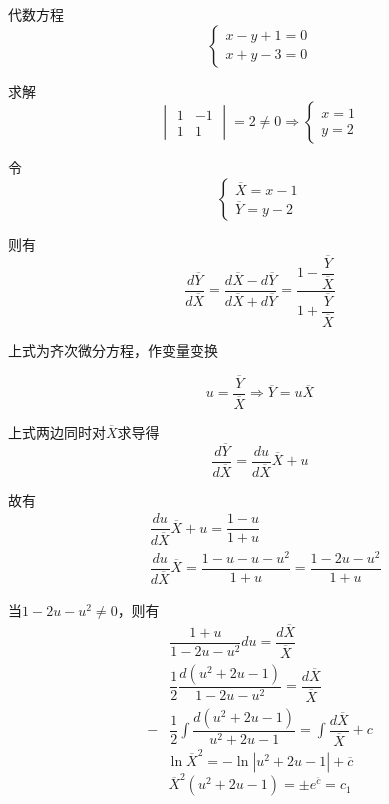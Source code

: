 \documentclass[oneside]{book} %
\begin{document}
\noindent {}
代数方程$$
\begin{cases}
    x - y + 1 = 0 \\
    x + y - 3 = 0
\end{cases}$$

求解$$\begin{vmatrix}
    1 & -1 \\
    1 & 1
\end{vmatrix} = 2 \neq 0 
\Rightarrow 
\begin{cases}
    x = 1 \\
    y = 2
\end{cases}$$

令$$
\begin{cases}
    \overline{X} = x - 1 \\
    \overline{Y} = y - 2
\end{cases} $$

则有$$\dfrac{d\overline{Y}}{d\overline{X}} = \dfrac{d\overline{X} - d\overline{Y}}{d\overline{X} + d\overline{Y}} = \dfrac{1 - \dfrac{\overline{Y}}{\overline{X}}}{1 + \dfrac{\overline{Y}}{\overline{X}}}$$

上式为齐次微分方程，作变量变换

$$u = \dfrac{\overline{Y}}{\overline{X}} \Rightarrow \overline{Y} = u\overline{X}$$

上式两边同时对$\overline{X}$求导得
$$\dfrac{d\overline{Y}}{d\overline{X}} = \dfrac{du}{d\overline{X}}\overline{X} + u$$

故有
\begin{align*}
    & \dfrac{du}{d\overline{X}}\overline{X} + u = \dfrac{1 - u}{1 + u} \\
    & \dfrac{du}{d\overline{X}}\overline{X} = \dfrac{1 - u - u - u^{2}}{1 + u} = \dfrac{1 - 2u - u^{2}}{1 + u}
\end{align*}

当$1 - 2u - u^{2} \neq 0 $，则有
\begin{align*}
    & \dfrac{1 + u}{1 - 2u - u^{2}} du = \dfrac{d\overline{X}}{\overline{X}} \\
    & \dfrac{1}{2} \dfrac{d(u^{2} + 2u - 1)}{1 - 2u - u^{2}} = \dfrac{d\overline{X}}{\overline{X}} \\
    -&\dfrac{1}{2} \int \dfrac{d(u^{2} + 2u - 1)}{u^{2} + 2u - 1} = \int \dfrac{d\overline{X}}{\overline{X}} + c     
\end{align*}
$$\ln \overline{X}^{2} = -\ln\left\lvert u^{2} + 2u - 1\right\rvert + \overline{c}$$
$$\overline{X}^{2}(u^{2} + 2u - 1) = \pm e^{\overline{c}} = c_{1}$$
\end{document}
